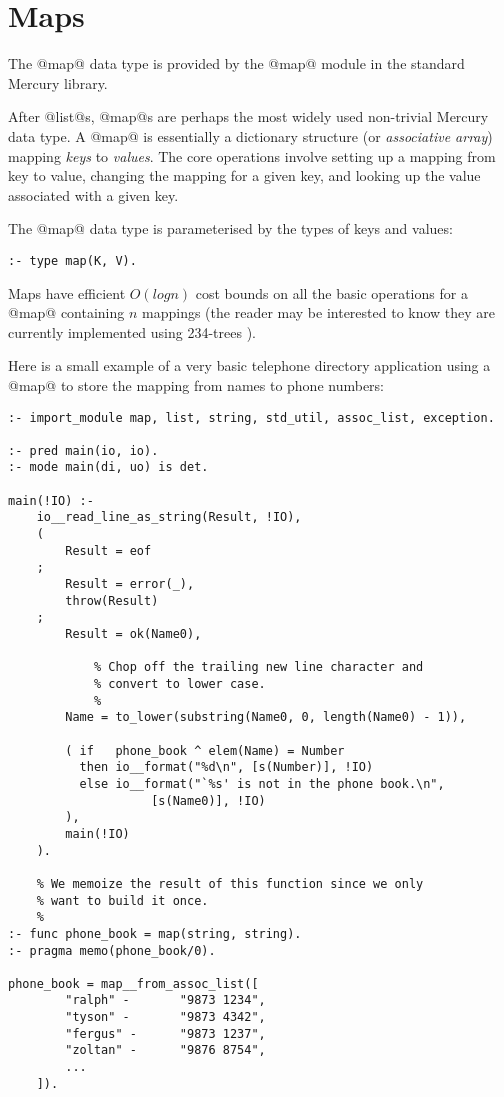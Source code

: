 
\chapter{Maps}

The @map@ data type is provided by the @map@ module in the standard
Mercury library.

After @list@s, @map@s are perhaps the most widely used non-trivial
Mercury data type.  A @map@ is essentially a dictionary structure
(or \emph{associative array})
mapping \emph{keys} to \emph{values}.  The core operations involve
setting up a mapping from key to value, changing the mapping for a
given key, and looking up the value associated with a given key.

The @map@ data type is parameterised by the types of keys and values:
\begin{verbatim}
:- type map(K, V).
\end{verbatim}
Maps have efficient $O(log n)$ cost bounds on all the basic
operations for a @map@ containing $n$ mappings (the reader may be
interested to know they are currently implemented using 234-trees
).

Here is a small example of a very basic telephone directory
application using a @map@ to store the mapping from names to
phone numbers:
\begin{verbatim}
:- import_module map, list, string, std_util, assoc_list, exception.

:- pred main(io, io).
:- mode main(di, uo) is det.

main(!IO) :-
    io__read_line_as_string(Result, !IO),
    (
        Result = eof
    ;
        Result = error(_),
        throw(Result)
    ;
        Result = ok(Name0),

            % Chop off the trailing new line character and
            % convert to lower case.
            %
        Name = to_lower(substring(Name0, 0, length(Name0) - 1)),

        ( if   phone_book ^ elem(Name) = Number
          then io__format("%d\n", [s(Number)], !IO)
          else io__format("`%s' is not in the phone book.\n",
                    [s(Name0)], !IO)
        ),
        main(!IO)
    ).

    % We memoize the result of this function since we only
    % want to build it once.
    %
:- func phone_book = map(string, string).
:- pragma memo(phone_book/0).

phone_book = map__from_assoc_list([
        "ralph" -       "9873 1234",
        "tyson" -       "9873 4342",
        "fergus" -      "9873 1237",
        "zoltan" -      "9876 8754",
        ...
    ]).
\end{verbatim}

